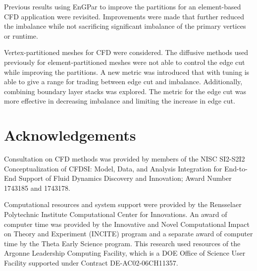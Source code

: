 \documentclass[conference]{IEEEtran}
\begin{document}
Previous results using EnGPar to improve the partitions for an element-based CFD application
were revisited. Improvements were made that further reduced the
imbalance while not sacrificing significant imbalance of the primary vertices or
runtime.

Vertex-partitioned meshes for CFD were considered. The diffusive methods used previously for
element-partitioned meshes were not able to control the edge cut while improving the partitions.
A new metric was introduced that with tuning is able to give a range for trading between edge
cut and imbalance. Additionally, combining boundary layer stacks was explored. The metric for
the edge cut was more effective in decreasing imbalance and limiting the increase in edge cut.



\section{Acknowledgements}

Consultation on CFD methods was provided by members of the NISC SI2-S2I2
Conceptualization of CFDSI: Model, Data, and Analysis Integration for End-to-End
Support of Fluid Dynamics Discovery and Innovation; Award Number 1743185 and 
1743178.

Computational resources and system support were provided by the Rensselaer
Polytechnic Institute Computational Center for Innovations.
An award of computer time was provided by the Innovative and Novel Computational
Impact on Theory and Experiment (INCITE) program and a separate award of
computer time by the Theta Early Science program.
This research used resources of the Argonne Leadership Computing Facility, which
is a DOE Office of Science User Facility supported under Contract
DE-AC02-06CH11357.



\end{document}
